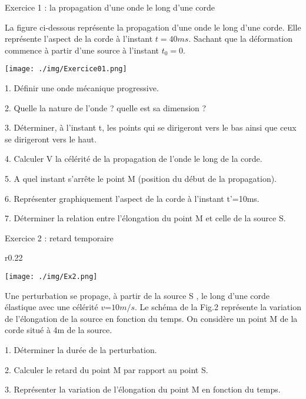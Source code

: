 \documentclass[12pt, french]{article}
\begin{document}
\begin{center}
\end{center}

\vspace{-0.2cm}
   \begin{Box2}{Exercice 1 :  la propagation d’une onde le long d’une corde}

La figure ci-dessous représente la propagation d’une onde le long d’une corde. Elle représente l’aspect de la
corde à l’instant $t = 40ms$. Sachant que la déformation commence à partir d’une source à l’instant $t_0 =0$.
   \begin{center}
	   \vspace{-0.6cm}
	\texttt{[image: ./img/Exercice01.png]}
  \end{center}
1. Définir une onde mécanique progressive.

2. Quelle la nature de l’onde ? quelle est sa dimension ?

3. Déterminer, à l’instant t, les points qui se dirigeront vers le bas ainsi que ceux se dirigeront vers le haut.

4. Calculer V la célérité de la propagation de l’onde le long de la corde.

5. A quel instant s’arrête le point M (position du début de la propagation).

6. Représenter graphiquement l’aspect de la corde à l’instant t’=10ms.

7. Déterminer la relation entre l’élongation du point M et celle de la source S.


   \end{Box2}


\begin{Box2}{Exercice 2 :  retard temporaire }
\begin{wrapfigure}{r}{0.22\textwidth}
  \begin{center}
	  \vspace{-0.6cm}
	\texttt{[image: ./img/Ex2.png]}
  \end{center}
\end{wrapfigure}
Une perturbation se propage, à partir de la source S , le long d’une corde élastique avec une célérité $v$=$10m/s$.
Le schéma de la Fig.2 représente la variation de l’élongation de la source en fonction du temps.
On considère un point M de la corde situé à 4m de la source.

1. Déterminer la durée de la perturbation.

2. Calculer le retard du point M par rapport au point S.

3. Représenter la variation de l’élongation du point M en fonction du temps.

\end{Box2}
\end{document}
